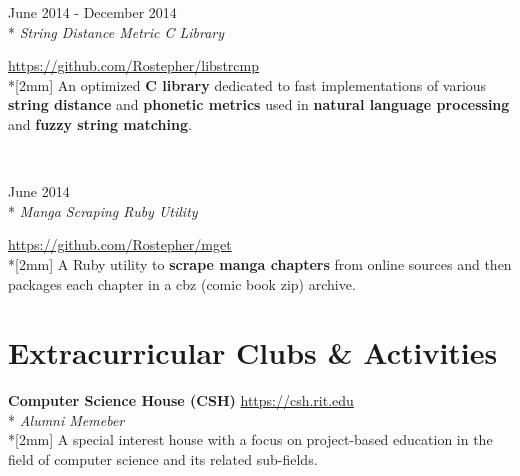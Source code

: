 \documentclass[a4paper,margin,line]{resume}
\newcommand{\rvspace}{2mm} %
\newcommand{\rurl}[1]{\hfill {\footnotesize \url{#1}}}
\newcommand{\rdate}[1]{\hfill {\small #1}}
\newcommand{\rdescription}[1]{\small #1 \normalsize}
\newcommand{\ritem}[5] {
    \item[#1]                               %
    \hfill \rdate{#2} \\*                   %
    \hfill {\small \emph{#3}}               %
    \strut \hfill \rurl{#4} \\*[\rvspace]   %
    \rdescription{#5}                       %
}
\newcommand{\rproject}{\ritem}
\newcommand{\rorganization}[4] {
    \item{\bf #1}                           %
    \rurl{#2} \\*                           %
    \hfill {\small \emph{#3}} \\*[\rvspace] %
    \rdescription{#4}                       %
}
\begin{document}
\begin{resume}
\begin{asparadesc}
    \rproject {libstrcmp}
              {June 2014 - December 2014}
              {String Distance Metric C Library}
              {https://github.com/Rostepher/libstrcmp}
    {
        An optimized {\bf C library} dedicated to fast implementations of
        various {\bf string distance} and {\bf phonetic metrics} used
        in {\bf natural language processing} and {\bf fuzzy string matching}.
    }
    \\

    \rproject {mget}
              {June 2014}
              {Manga Scraping Ruby Utility}
              {https://github.com/Rostepher/mget}
    {
        A Ruby utility to {\bf scrape manga chapters} from online sources
        and then packages each chapter in a cbz (comic book zip) archive.
    }
\end{asparadesc}

\section{\mysidestyle Extracurricular Clubs \& Activities}
\begin{asparablank}
    \rorganization {Computer Science House ({\small CSH})}
                   {https://csh.rit.edu}
                   {Alumni Memeber}
    {
        A special interest house with a focus on project-based education in
        the field of computer science and its related sub-fields.
    }
\end{asparablank}

\end{resume}
\end{document}
